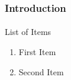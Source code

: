 \documentclass{beamer}
\date{}
\title{} %
\author{} %
\institute{Fashion Institute of Technology}
\begin{document}
\begin{frame}
	\frametitle{Introduction}
	\framesubtitle{}

List of Items
\begin{enumerate}
\item First Item
\item Second Item
\end{enumerate}


\end{frame}
\begin{frame}


\end{frame}
\begin{frame}


\end{frame}
\begin{frame}


\end{frame}
\begin{frame}


\end{frame}
\begin{frame}


\end{frame}
\begin{frame}


\end{frame}
\begin{frame}


\end{frame}
\begin{frame}


\end{frame}
\begin{frame}


\end{frame}
\begin{frame}

\end{frame}
\end{document}
